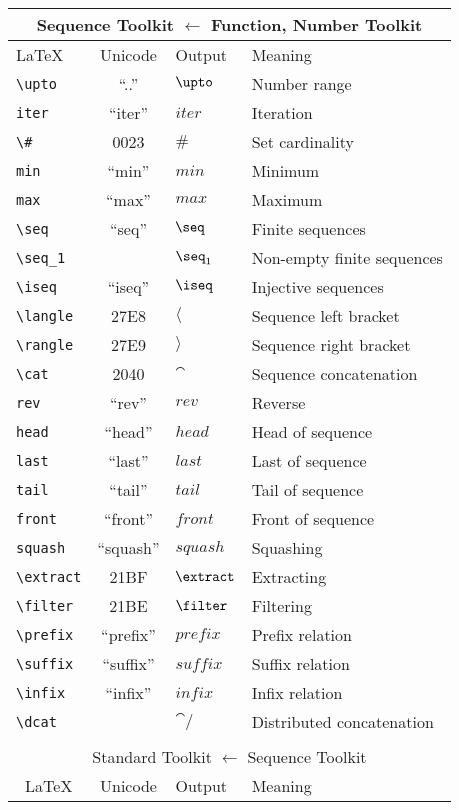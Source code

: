 \begin{tabular}{lcll}
\hline
\multicolumn{4}{|c|}{Sequence Toolkit $\leftarrow$ Function, Number Toolkit} \\
\hline
\multicolumn{1}{|l|}{\LaTeX} & \multicolumn{1}{c|}{Unicode} & \multicolumn{1}{l|}{Output} & \multicolumn{1}{l|}{Meaning} \\
\hline
\verb'\upto' & ``..'' & $\upto$ & Number range \\
\verb'iter' & ``iter'' & $iter$ & Iteration \\
\verb'\#' & 0023 & $\#$ & Set cardinality \\
\verb'min' & ``min'' & $min$ & Minimum \\
\verb'max' & ``max'' & $max$ & Maximum \\
\verb'\seq' & ``seq'' & $\seq$ & Finite sequences \\
\verb'\seq_1' &  & $\seq_1$ & Non-empty finite sequences \\
\verb'\iseq' & ``iseq'' & $\iseq$ & Injective sequences \\
\verb'\langle' & 27E8 & $\langle$ & Sequence left bracket \\
\verb'\rangle' & 27E9 & $\rangle$ & Sequence right bracket \\
\verb'\cat' & 2040 & $\cat$ & Sequence concatenation \\
\verb'rev' & ``rev'' & $rev$ & Reverse \\
\verb'head' & ``head'' & $head$ & Head of sequence \\
\verb'last' & ``last'' & $last$ & Last of sequence \\
\verb'tail' & ``tail'' & $tail$ & Tail of sequence \\
\verb'front' & ``front'' & $front$ & Front of sequence \\
\verb'squash' & ``squash'' & $squash$ & Squashing \\
\verb'\extract' & 21BF & $\extract$ & Extracting \\
\verb'\filter' & 21BE & $\filter$ & Filtering \\
\verb'\prefix' & ``prefix'' & $prefix$ & Prefix relation \\
\verb'\suffix' & ``suffix'' & $suffix$ & Suffix relation \\
\verb'\infix' & ``infix'' & $infix$ & Infix relation \\
\verb'\dcat' &  & ${\cat}/$ & Distributed concatenation \\
 &  &  &  \\
\hline
\multicolumn{4}{|c|}{Standard Toolkit $\leftarrow$ Sequence Toolkit} \\
\hline
\multicolumn{1}{|c|}{\LaTeX} & \multicolumn{1}{c|}{Unicode} & \multicolumn{1}{l|}{Output} & \multicolumn{1}{l|}{Meaning} \\
\hline
\end{tabular}
